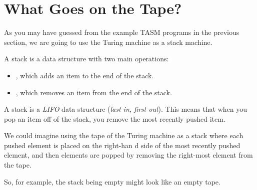 \section{What Goes on the Tape?}

As you may have guessed from the example TASM programs in the previous section, we are going to use the Turing machine as a stack machine.

A stack is a data structure with two main operations:

\begin{itemize}
    \item {}, which adds an item to the end of the stack.
    \item {}, which removes an item from the end of the stack.
\end{itemize}

A stack is a \textit{LIFO} data structure (\textit{last in, first out}). This means that when you pop an item off of the stack, you remove the most recently pushed item.

We could imagine using the tape of the Turing machine as a stack where each pushed element is placed on the right-han d side of the most recently pushed element, and then elements are popped by removing the right-most element from the tape.

So, for example, the stack being empty might look like an empty tape.

\begin{center}
\end{center}

